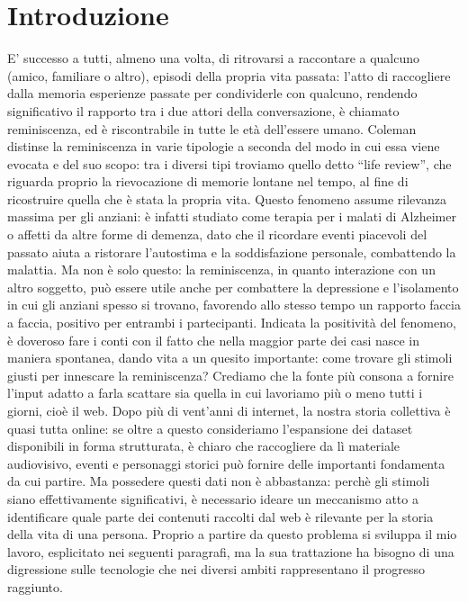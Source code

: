 \documentclass[sigproc-sp.tex]{subfiles}
\begin{document}
\section{Introduzione}
E’ successo a tutti, almeno una volta, di ritrovarsi a raccontare a qualcuno (amico, familiare o altro), episodi della propria vita passata: l’atto di raccogliere dalla memoria esperienze passate per condividerle con qualcuno, rendendo significativo il rapporto tra i due attori della conversazione, è chiamato reminiscenza, ed è riscontrabile in tutte le età dell’essere umano. Coleman distinse la reminiscenza in varie tipologie a seconda del modo in cui essa viene evocata e del suo scopo: tra i diversi tipi troviamo quello detto “life review”, che riguarda proprio la rievocazione di memorie lontane nel tempo, al fine di ricostruire quella che è stata la propria vita\cite{coleman1974measuring}. Questo fenomeno assume rilevanza massima per gli anziani: è infatti studiato come terapia per i malati di Alzheimer o affetti da altre forme di demenza, dato che il ricordare eventi piacevoli del passato aiuta a ristorare l’autostima e la soddisfazione personale, combattendo la malattia. Ma non è solo questo: la reminiscenza, in quanto interazione con un altro soggetto, può essere utile anche per combattere la depressione e l’isolamento in cui gli anziani spesso si trovano, favorendo allo stesso tempo un rapporto faccia a faccia, positivo per entrambi i partecipanti.
Indicata la positività del fenomeno, è doveroso fare i conti con il fatto che nella maggior parte dei casi nasce in maniera spontanea, dando vita a un quesito importante: come trovare gli stimoli giusti per innescare la reminiscenza? Crediamo che la fonte più consona a fornire l’input adatto a farla scattare sia quella in cui lavoriamo più o meno tutti i giorni, cioè il web. Dopo più di vent’anni di internet, la nostra storia collettiva è quasi tutta online: se oltre a questo consideriamo l’espansione dei dataset disponibili in forma strutturata, è chiaro che raccogliere da lì materiale audiovisivo, eventi e personaggi storici può fornire delle importanti fondamenta da cui partire.
Ma possedere questi dati non è abbastanza: perchè gli stimoli siano effettivamente significativi, è necessario ideare un meccanismo atto a identificare quale parte dei contenuti raccolti dal web è rilevante per la storia della vita di una persona. Proprio a partire da questo problema si sviluppa il mio lavoro, esplicitato nei seguenti paragrafi, ma la sua trattazione ha bisogno di una digressione sulle tecnologie che nei diversi ambiti rappresentano il progresso raggiunto.
\vspace*{1\baselineskip}
\end{document}
